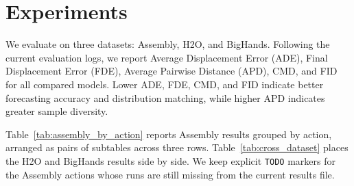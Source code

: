 \newcommand{\best}[1]{\textbf{#1}}
\newcommand{\second}[1]{\underline{#1}}

\section{Experiments}
\label{sec:experiments}

We evaluate \modelname{} on three datasets: Assembly, H2O, and BigHands. Following the current evaluation logs, we report Average Displacement Error (ADE), Final Displacement Error (FDE), Average Pairwise Distance (APD), CMD, and FID for all compared models. Lower ADE, FDE, CMD, and FID indicate better forecasting accuracy and distribution matching, while higher APD indicates greater sample diversity.

Table~\ref{tab:assembly_by_action} reports Assembly results grouped by action, arranged as pairs of subtables across three rows. Table~\ref{tab:cross_dataset} places the H2O and BigHands results side by side. We keep explicit \texttt{TODO} markers for the Assembly actions whose \modelname{} runs are still missing from the current results file.

